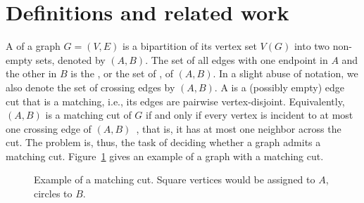 \section{Definitions and related work}

A  of a graph $G = (V, E)$ is a bipartition of its vertex set $V(G)$ into two non-empty sets, denoted by $(A,B)$.
The set of all edges with one endpoint in $A$ and the other in $B$ is the , or the set of , of $(A,B)$.
In a slight abuse of notation, we also denote the set of crossing edges by $(A,B)$.
A  is a (possibly empty) edge cut that is a matching, i.e., its edges are pairwise vertex-disjoint.
Equivalently, $(A, B)$ is a matching cut of $G$ if and only if every vertex is incident to at most one crossing edge of $(A, B)$~\citep{matching_cut_graham, chvatal_matching_cut}, that is, it has at most one neighbor across the cut.
The  problem is, thus, the task of deciding whether a graph admits a matching cut.
Figure~\ref{fig:matching_cut} gives an example of a graph with a matching cut.



\begin{figure}[!htb]
        \centering
        \caption{Example of a matching cut. Square vertices would be assigned to $A$, circles to $B$.\label{fig:matching_cut}}
    \end{figure}


